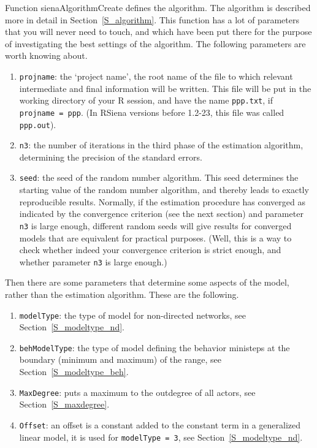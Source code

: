 \documentclass[a4paper,fleqn,11pt]{article}
\newcommand{\+}{\, + \,}
\newcommand{\RS}{{\sf \textsf{RSiena} }}
\begin{document}
Function \textsf{sienaAlgorithmCreate} defines the algorithm.
The algorithm is described more in detail in Section~\ref{S_algorithm}.
This function has a lot of parameters that you will never need to touch,
and which have been put there for the purpose of investigating
the best settings of the algorithm.
The following parameters are worth knowing about.
\begin{enumerate}
  \item \texttt{projname}: the `project name', the root name of the file
       to which relevant intermediate and final information will be written.
       This file will be put in the working directory of your R session,
       and have the name \texttt{ppp.txt}, if \texttt{projname~=~ppp}.
       (In \RS versions before 1.2-23, this file was called \texttt{ppp.out}).
  \item \texttt{n3}: the number of iterations in the third phase of the estimation
       algorithm, determining the precision of the standard errors.
  \item \texttt{seed}: the seed of the random number algorithm. This seed determines
       the starting value of the random number algorithm, and thereby leads
       to exactly reproducible results. Normally, if the estimation procedure
       has converged as indicated by the convergence criterion (see the next section) and
       parameter \texttt{n3} is large enough, different random seeds will give
       results for converged models that are equivalent for practical purposes.
       (Well, this is a way to check
       whether indeed your convergence criterion is strict enough, and whether
       parameter \texttt{n3} is large enough.)
\end{enumerate}
Then there are some parameters that determine some aspects of the
model, rather than the estimation algorithm. These are the following.
\begin{enumerate}[resume]
  \item \texttt{modelType}: the type of model for non-directed networks,
        see Section~\ref{S_modeltype_nd}.
  \item \texttt{behModelType}: the type of model defining the behavior
        ministeps at the boundary (minimum and maximum) of the range,
        see Section~\ref{S_modeltype_beh}.
  \item \texttt{MaxDegree}: puts a maximum to the outdegree of all actors,
        see Section~\ref{S_maxdegree}.
  \item \texttt{Offset}: an offset is a constant added to the
        constant term in a generalized linear model, it is used for
         \texttt{modelType~=~3}, see Section~\ref{S_modeltype_nd}.
\end{enumerate}
\end{document}
